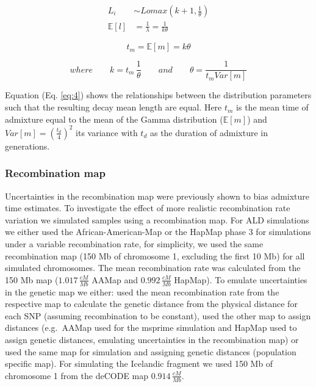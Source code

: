 \documentclass[]{article}
\begin{document}
\begin{equation}
\begin{split}
\label{eq:3}
L_i &\sim Lomax(k+1,\frac{1}{\theta}) \\
\mathbb{E}[l] &= \frac{1}{\lambda} = \frac{1}{k\theta}
\end{split}
\end{equation}

\begin{equation}
\label{eq:4}
t_{m}=\mathbb{E}[m] = k \theta
\end{equation}

\begin{equation*}
\nonumber
where \qquad k=t_m \, \frac{1}{\theta} \qquad and \qquad \theta=\frac{1}{t_{m}Var[m]}
\end{equation*}

Equation (Eq. \ref{eq:4}) shows the relationships between the
distribution parameters such that the resulting decay mean length are
equal. Here  $t_{m}$ is the mean time of admixture equal to the mean of the Gamma distribution ($\mathbb{E}[m]$) and $Var[m]=(\frac{t_d}{4})^2$ its variance with $t_d$ as the duration of admixture in generations.

\subsubsection{Recombination map}\label{recombination map}

Uncertainties in the recombination map were previously shown to bias
admixture time estimates. To investigate the effect of more realistic
recombination rate variation we simulated samples using a recombination map. For ALD simulations we
either used the African-American-Map \citep{hinch_landscape_2011} or
the HapMap phase 3 \citep{HapMapConsortium_second_2007} for simulations
under a variable recombination rate, for simplicity, we used the same
recombination map (150 Mb of chromosome 1, excluding the first 10 Mb)
for all simulated chromosomes. The mean recombination rate was
calculated from the 150 Mb map (\(1.017 \, \frac{cM}{Mb}\) AAMap and
\(0.992 \, \frac{cM}{Mb}\) HapMap). To emulate uncertainties in the
genetic map we either: used the mean recombination rate from the
respective map to calculate the genetic distance from the physical
distance for each SNP (assuming recombination to be constant), used the other map to assign distances
(e.g.~AAMap used for the msprime simulation and HapMap used to assign
genetic distances, emulating uncertainties in the recombination map) or used the same map for simulation and assigning
genetic distances (population specific map). For simulating the Icelandic fragment we used 150 Mb of chromosome 1 from the deCODE map \citep{kong_fine-scale_2010} \(0.914 \, \frac{cM}{Mb}\).
\end{document}

